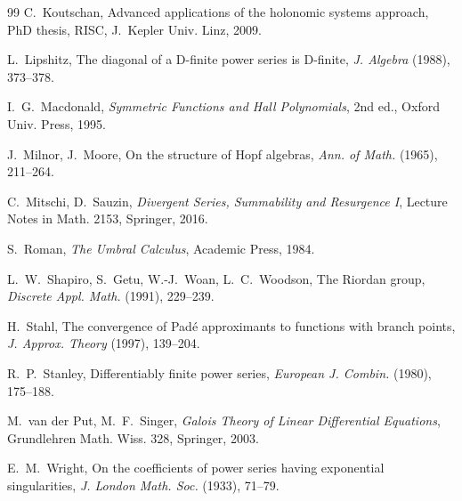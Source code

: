 \documentclass{article}
\newcommand{\tmem}[1]{{\em #1\/}}
\newcommand{\tmtextbf}[1]{\text{{\bfseries{#1}}}}
\begin{document}
\begin{thebibliography}{99}
  C.~Koutschan, Advanced applications of the holonomic
  systems approach, PhD thesis, RISC, J.~Kepler Univ. Linz, 2009.
  
  L.~Lipshitz, The diagonal of a D-finite power series is
  D-finite, {\tmem{J. Algebra}} \tmtextbf{113} (1988), 373--378.
  
  I.~G.~Macdonald, {\tmem{Symmetric Functions and Hall
  Polynomials}}, 2nd ed., Oxford Univ. Press, 1995.
  
  J.~Milnor, J.~Moore, On the structure of Hopf
  algebras, {\tmem{Ann. of Math.}} \tmtextbf{81} (1965), 211--264.
  
  C.~Mitschi, D.~Sauzin, {\tmem{Divergent Series,
  Summability and Resurgence I}}, Lecture Notes in Math. 2153, Springer, 2016.
  
  S.~Roman, {\tmem{The Umbral Calculus}}, Academic Press,
  1984.
  
  L.~W.~Shapiro, S.~Getu, W.-J.~Woan, L.~C.~Woodson, The
  Riordan group, {\tmem{Discrete Appl. Math.}} \tmtextbf{34} (1991), 229--239.
  
  H.~Stahl, The convergence of Pad{\'e} approximants to
  functions with branch points, {\tmem{J. Approx. Theory}} \tmtextbf{91}
  (1997), 139--204.
  
  R.~P.~Stanley, Differentiably finite power series,
  {\tmem{European J. Combin.}} \tmtextbf{1} (1980), 175--188.
  
  M.~van der Put, M.~F.~Singer, {\tmem{Galois Theory of Linear
  Differential Equations}}, Grundlehren Math. Wiss. 328, Springer, 2003.
  
  E.~M.~Wright, On the coefficients of power series
  having exponential singularities, {\tmem{J. London Math. Soc.}} \tmtextbf{8}
  (1933), 71--79.
\end{thebibliography}
\end{document}
